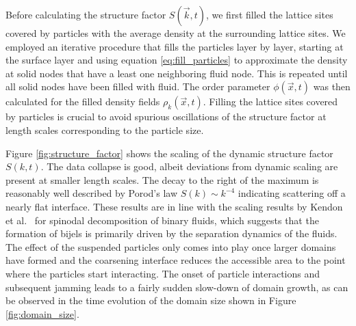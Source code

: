 Before calculating the structure factor \(S(\vec{k},t)\), we
first filled the lattice sites covered by particles with the average
density at the surrounding lattice sites. We employed an iterative
procedure that fills the particles layer by layer, starting at the
surface layer and using equation \eqref{eq:fill_particles} to
approximate the density at solid nodes that have a least one neighboring
fluid node. This is repeated until all solid nodes have been filled with
fluid. The order parameter \(\phi(\vec{x},t)\) was then calculated for
the filled density fields \(\rho_k(\vec{x},t)\). Filling the lattice
sites covered by particles is crucial to avoid spurious oscillations of
the structure factor at length scales corresponding to the particle
size.

Figure \ref{fig:structure_factor} shows the scaling of the dynamic
structure factor \(S(k,t)\). The data collapse is good, albeit
deviations from dynamic scaling are present at smaller length scales.
The decay to the right of the maximum is reasonably well described by
Porod's law \(S(k)\sim k^{-4}\) indicating scattering off a nearly flat
interface. These results are in line with the scaling results by Kendon
et al.~\cite{kendon_3d_1999, kendon_inertial_2001} for spinodal
decomposition of binary fluids, which suggests that the formation of
bijels is primarily driven by the separation dynamics of the fluids. The
effect of the suspended particles only comes into play once larger
domains have formed and the coarsening interface reduces the accessible
area to the point where the particles start interacting. The onset of
particle interactions and subsequent jamming leads to a fairly sudden
slow-down of domain growth, as can be observed in the time evolution of
the domain size shown in Figure \ref{fig:domain_size}.

